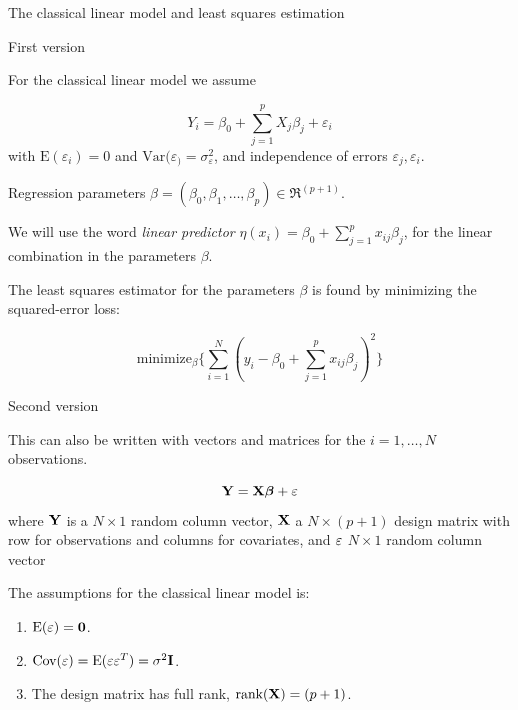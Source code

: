 \documentclass[
  ignorenonframetext,
]{beamer}
\begin{document}
\begin{frame}

\begin{block}{The classical linear model and least squares estimation}

\begin{block}{First version}

For the classical linear model we assume

\[ Y_i=\beta_0+\sum_{j=1}^p X_{j}\beta_j+\varepsilon_i\] with
\(\text{E}(\varepsilon_i)=0\) and
\(\text{Var}(\varepsilon_)=\sigma^2_{\varepsilon}\), and independence of
errors \(\varepsilon_j,\varepsilon_i\).

Regression parameters
\(\beta=(\beta_0,\beta_1,\ldots,\beta_p)\in \Re^{(p+1)}\).

We will use the word \emph{linear predictor}
\(\eta(x_i)=\beta_0+\sum_{j=1}^p x_{ij}\beta_j\), for the linear
combination in the parameters \(\beta\).

The least squares estimator for the parameters \(\beta\) is found by
minimizing the squared-error loss:

\[ \text{minimize}_{\beta} \{ \sum_{i=1}^N (y_i-\beta_0+\sum_{j=1}^p x_{ij}\beta_j)^2\}\]

\end{block}

\end{block}

\end{frame}

\begin{frame}

\begin{block}{Second version}

This can also be written with vectors and matrices for the
\(i=1,\ldots,N\) observations.

\[{\bf Y=X \boldsymbol{\beta}}+{\bf\varepsilon}\] where \({\bf Y}\) is a
\(N \times 1\) random column vector, \({\bf X}\) a \(N \times (p+1)\)
design matrix with row for observations and columns for covariates, and
\({\bf{\varepsilon}}\) \(N \times 1\) random column vector

The assumptions for the classical linear model is:

\begin{enumerate}
\item
  \(\text{E}(\bf{\varepsilon})=\bf{0}\).
\item
  \(\text{Cov}(\varepsilon)=\text{E}(\varepsilon \varepsilon^T)=\sigma^2\bf{I}\).
\item
  The design matrix has full rank, \(\text{rank}({\bf X})=(p+1)\).
\end{enumerate}

\end{block}

\end{frame}
\end{document}
